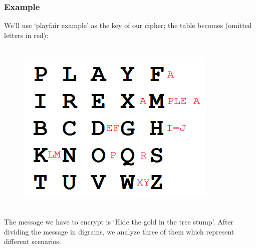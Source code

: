 \documentclass[Lau,binding=0.6cm,oneside]{sapthesis}
\begin{document}
\subsubsection{Example}
We'll use `playfair example' as the key of our cipher; the table becomes (omitted letters in red):\\\\
\begin{figure}[H]
\includegraphics[scale=0.8]{playfair_example}
\centering
\caption{}
\centering
\end{figure}
\ \\
The message we have to encrypt is `Hide the gold in the tree stump'. After dividing the message in digrams, we analyze three of them which represent different scenarios.\\\\
\end{document}

